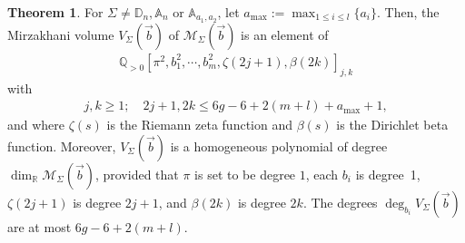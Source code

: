 \documentclass{amsart}
\renewcommand{\AA}{\mathbb{A}}
\newcommand{\DD}{\mathbb{D}}
\newcommand{\QQ}{\mathbb{Q}}
\theoremstyle{definition}
\newtheorem{theorem}[proposition]{Theorem}
\begin{document}
\begin{theorem}
\label{thm:generalmirzvolumes}
For $\Sigma\neq\DD_n, \AA_n$ or $\mathbb{A}_{a_1,a_2}$, let $a_{\max}:=\max_{1\leqslant i\leqslant l}\{a_i\}$. Then, the Mirzakhani volume $V_\Sigma(\vec{b})$ of $\mathcal{M}_\Sigma(\vec{b})$ is an element of
\begin{align*}
\QQ_{>0}[\pi^2, b_1^2,\cdots,b_m^2, \zeta(2j+1),\beta(2k)]_{j,k}
\end{align*}
with 
\begin{align*}
j,k\geqslant1;\quad
2j+1,2k \leqslant 6g-6+2(m+l)+ a_{\max}+1,    
\end{align*}
and where $\zeta(s)$ is the Riemann zeta function and $\beta(s)$ is the Dirichlet beta function. Moreover, $V_\Sigma(\vec{b})$ is a homogeneous polynomial of degree $\dim_{\mathbb{R}}\mathcal{M}_{\Sigma}(\vec{b})$, provided that $\pi$ is set to be degree $1$, each $b_i$ is degree~1, $\zeta(2j+1)$ is degree $2j+1$, and $\beta(2k)$ is degree $2k$. The degrees $\deg_{b_i}V_{\Sigma}(\vec{b})$ are at most $6g-6+2(m+l).$
\end{theorem}
\end{document}
